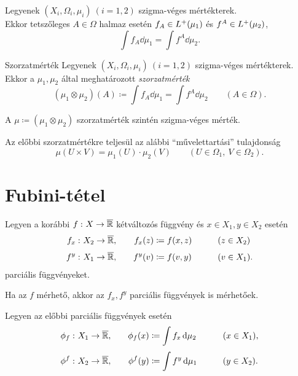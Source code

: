 \documentclass[
]{elteikthesis}[2024/04/26]
\begin{document}
	\begin{statement}{}{}
		Legyenek \( (X_i, \Omega_i, \mu_i) \ (i=1,2) \) szigma-véges mértékterek.\\[6pt]
		Ekkor tetszőleges \( A \in \Omega \) halmaz esetén 
		\( f_A \in L^+(\mu_1) \) és \( f^A \in L^+(\mu_2) \),
		\[
			\int f_A \dd{\mu_1} = 
			\int f^A \dd{\mu_2}.
		\]
	\end{statement}
	
	\begin{definition}{Szorzatmérték}{}
		Legyenek \( (X_i, \Omega_i, \mu_i) \ (i=1,2) \) szigma-véges mértékterek.\\[6pt]
		Ekkor a \( \mu_1, \mu_2 \) által meghatározott \emph{szorzatmérték}
		\[
			(\mu_1 \otimes \mu_2) (A) \coloneq
			\int f_A \dd{\mu_1} = 
			\int f^A \dd{\mu_2}
			\qquad (A \in \Omega).
		\]
	\end{definition}
	
	\begin{notes}
		\item A \( \mu \coloneq (\mu_1 \otimes \mu_2) \) szorzatmérték szintén szigma-véges mérték.
		\item Az előbbi szorzatmértékre teljesül az alábbi ``művelettartási'' tulajdonság
		\[
			\mu(U \times V) = \mu_1(U) \cdot \mu_2(V)
			\qquad (U \in \Omega_1, \ V \in \Omega_2).
		\]
	\end{notes}
	
	\newpage
	\section{Fubini-tétel}
	
	\noindent
	Legyen a korábbi \( f \,\colon X \to \overline{\mathbb{R}} \) kétváltozós függvény 
	és \( x \in X_1, y \in X_2 \) esetén
	\begin{alignat*}{3}
		f_x \,\colon X_2 \to \overline{\mathbb{R}},& \quad 
		&{} f_x(z) &\coloneq f(x, z) \qquad &&(z \in X_2) \\[3pt]
		f^y \,\colon X_1 \to \overline{\mathbb{R}},& \quad 
		&{} f^y(v) &\coloneq f(v, y) \qquad &&(v \in X_1).
	\end{alignat*}
	parciális függvényeket.
	
	\begin{statement}{}{}
		Ha az \( f \) mérhető, akkor az \( f_x, f^y \) parciális függvények is mérhetőek.
	\end{statement}
	
	\vspace{6pt}
	\noindent
	Legyen az előbbi parciális függvények esetén
	\begin{alignat*}{3}
		\phi_f \,\colon X_1 \to \overline{\mathbb{R}},& \quad 
		&{} \phi_f(x) &\coloneq \int f_x \mathop{}\!\mathrm{d}{\mu_2} \qquad &&(x \in X_1), \\[3pt]
		\phi^f \,\colon X_2 \to \overline{\mathbb{R}},& \quad 
		&{} \phi^f(y) &\coloneq \int f^y \mathop{}\!\mathrm{d}{\mu_1} \qquad &&(y \in X_2).
	\end{alignat*}
	
\end{document}
